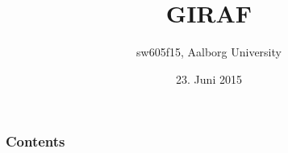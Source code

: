 \documentclass[12pt,svgnames,]{beamer}
\date{23. Juni 2015}
\begin{document}
\captionsetup[figure]{font=small,singlelinecheck=off,justification=raggedright}
\title[Deployment and Management of the GIRAF Project - Group sw605f15]{GIRAF}
\author[slide \insertframenumber /\inserttotalframenumber]{sw605f15, Aalborg University}
\frame{\maketitle\thispagestyle{empty}}

\begin{frame}
  \frametitle{Contents}
  \begin{multicols}{2}
  	\tableofcontents
  \end{multicols}
\end{frame}


\subsection{}
\begin{frame}
\end{frame}
\end{document}
